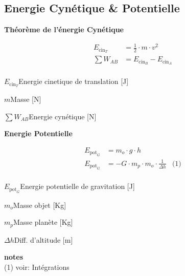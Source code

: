 \documentclass[12pt,a4paper]{article} %
\newcommand\frametitle[1]{ {\bfseries #1} \\[5pt] }
\newcommand\framenote[1]{
	{\small {\bfseries notes} \\ #1}
}
\begin{document}
\newpage

\subsection{Energie Cynétique \& Potentielle}

\newcommand\ex[1]{E_{#1}}
\newcommand\ecin{\ex{\text{cin}}}
\newcommand\ecinx[1]{\ex{\text{cin}_{#1}}}
\newcommand\epot{\ex{\text{pot}}}
\newcommand\epotx[1]{\ex{\text{pot}_{#1}}}
\newcommand\sumw[1]{\sum W_{#1}}

\begin{mdframed}
	\frametitle{Théorème de l'énergie Cynétique}
	\begin{twocols}[0.4][0.6]
		\begin{align*}
			\ecinx{T} &= \frac{1}{2} \cdot m \cdot v^2 \\
			\sumw{AB} &= \ecinx{B} - \ecinx{A} \\
		\end{align*}
	\nextcol
		\begin{vardef}
			\item{$\ecinx{T}$}{Energie cinetique de translation [J]}
			\item{$m$}{Masse [N]}
			\item{$\sumw{AB}$}{Energie cynétique [N]}
		\end{vardef}
	\end{twocols}

\end{mdframed}
\vspace{1em}
\begin{mdframed}
	\frametitle{Energie Potentielle}
	\begin{twocols}[0.4][0.6]
		\begin{align*}
			\epotx{G} &= m_o \cdot g \cdot h \\
			\epotx{G} &= -G \cdot m_p \cdot m_o \cdot \frac{1}{\Delta h} & \text{(1)} \\
		\end{align*}
	\nextcol
		\begin{vardef}
			\item{$\epotx{G}$}{Energie potentielle de gravitation [J]}
			\item{$m_o$}{Masse objet [Kg]}
			\item{$m_p$}{Masse planète [Kg]}
			\item{$\Delta h$}{Diff. d'altitude [m]}
		\end{vardef}

		\framenote{(1) voir: Intégrations}

	\end{twocols}

\end{mdframed}
\end{document}
